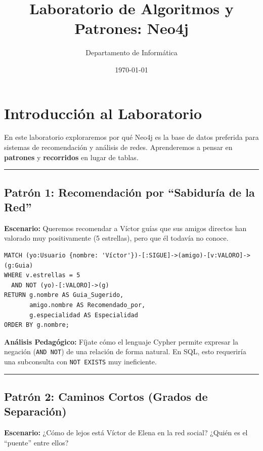 \documentclass[12pt,a4paper]{article}
\title{\textbf{Laboratorio de Algoritmos y Patrones: Neo4j}}
\author{Departamento de Informática}
\date{\today}
\begin{document}
\maketitle

\section{Introducción al Laboratorio}\label{intro}
En este laboratorio exploraremos por qué Neo4j es la base de datos preferida para sistemas de recomendación y análisis de redes. Aprenderemos a pensar en \textbf{patrones} y \textbf{recorridos} en lugar de tablas.

\begin{center}\rule{0.5\linewidth}{0.5pt}\end{center}

\subsection{Patrón 1: Recomendación por \enquote{Sabiduría de la Red}}\label{reco}
\textbf{Escenario:} Queremos recomendar a Víctor guías que sus amigos directos han valorado muy positivamente (5 estrellas), pero que él todavía no conoce.

\begin{tcolorbox}[title=Consulta de Recomendación]
\begin{lstlisting}
MATCH (yo:Usuario {nombre: 'Víctor'})-[:SIGUE]->(amigo)-[v:VALORO]->(g:Guia)
WHERE v.estrellas = 5
  AND NOT (yo)-[:VALORO]->(g)
RETURN g.nombre AS Guia_Sugerido, 
       amigo.nombre AS Recomendado_por, 
       g.especialidad AS Especialidad
ORDER BY g.nombre;
\end{lstlisting}
\end{tcolorbox}

\textbf{Análisis Pedagógico:} Fíjate cómo el lenguaje Cypher permite expresar la negación (\texttt{AND NOT}) de una relación de forma natural. En SQL, esto requeriría una subconsulta con \texttt{NOT EXISTS} muy ineficiente.

\begin{center}\rule{0.5\linewidth}{0.5pt}\end{center}

\subsection{Patrón 2: Caminos Cortos (Grados de Separación)}\label{shortest}
\textbf{Escenario:} ¿Cómo de lejos está Víctor de Elena en la red social? ¿Quién es el \enquote{puente} entre ellos?
\end{document}
